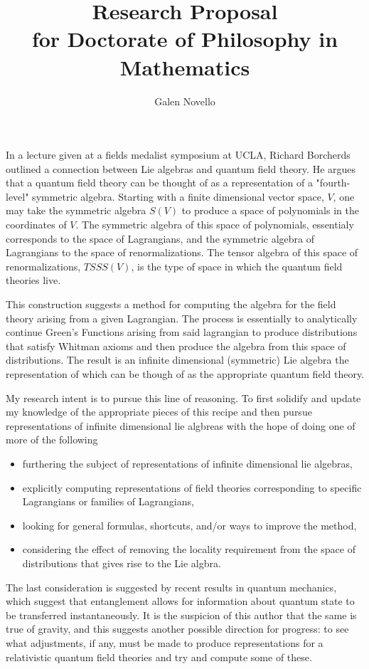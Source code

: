 \documentclass[11pt]{article} %
\title{Research Proposal\\
 for Doctorate of Philosophy in Mathematics}
\author{Galen Novello}
\begin{document}
\maketitle

In a lecture given at a fields medalist symposium at UCLA, Richard Borcherds outlined a connection between Lie algebras and quantum field theory.  He argues that a quantum field theory can be thought of as a representation of a "fourth-level" symmetric algebra. Starting with a finite dimensional vector space, $V$, one may take the symmetric algebra $S(V)$ to produce a space of polynomials in the coordinates of $V$.  The symmetric algebra of this space of polynomials, essentialy corresponds to the space of Lagrangians, and the symmetric algebra of Lagrangians to the space of renormalizations.  The tensor algebra of this space of renormalizations, $TSSS(V)$, is the type of space in which the quantum field theories live.   

This construction suggests a method for computing the algebra for the field theory arising from a given Lagrangian. The process is essentially to analytically continue Green's Functions arising from said lagrangian to produce distributions that satisfy Whitman axioms and then produce the algebra from this space of distributions.  The result is an infinite dimensional (symmetric) Lie algebra the representation of which can be though of as the appropriate quantum field theory.

My research intent is to pursue this line of reasoning.  To first solidify and update my knowledge of the appropriate pieces of this recipe and then pursue representations of infinite dimensional lie algbreas with the hope of doing one of more of the following 
\begin{itemize}
\item furthering the subject of representations of infinite dimensional lie algebras,
\item explicitly computing representations of field theories corresponding to specific Lagrangians or families of Lagrangians,
\item looking for general formulas, shortcuts, and/or ways to improve the method,
\item considering the effect of removing the locality requirement from the space of distributions that gives rise to the Lie algbra. 

\end{itemize}

The last consideration is suggested by recent results in quantum mechanics, which suggest that entanglement allows for information about quantum state to be transferred instantaneously. It is the suspicion of this author that the same is true of gravity, and this suggests another possible direction for progress: to see what adjustments, if any, must be made to produce representations for a relativistic quantum field theories and try and compute some of these. 
\end{document}
